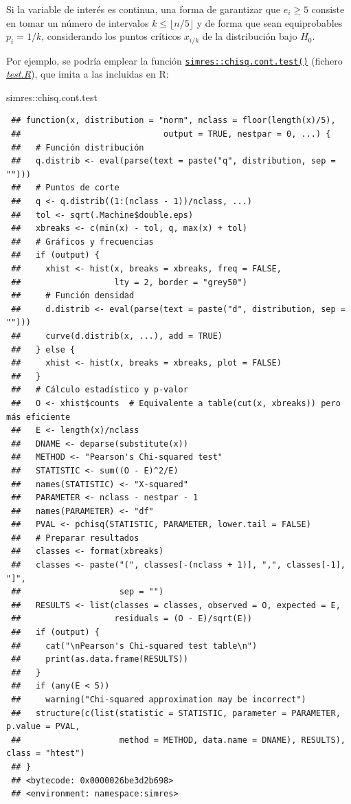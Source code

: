 \documentclass[
  10pt,
]{book}
\newenvironment{Shaded}{\begin{snugshade}}{\end{snugshade}}
\newcommand{\NormalTok}[1]{#1}
\newcommand{\SpecialCharTok}[1]{\textcolor[rgb]{0.00,0.00,0.00}{#1}}
\theoremstyle{break}
\theoremstyle{nonumberplain}
\begin{document}
Si la variable de interés es continua, una forma de garantizar que \(e_{i}\geq5\) consiste en tomar un número de intervalos \(k\leq \lfloor n/5 \rfloor\) y de forma que sean equiprobables \(p_{i}=1/k\),
considerando los puntos críticos \(x_{i/k}\) de la distribución bajo \(H_0\).

Por ejemplo, se podría emplear la función \href{https://rubenfcasal.github.io/simres/reference/chisq.cont.test.html}{\texttt{simres::chisq.cont.test()}} (fichero \href{R/test.R}{\emph{test.R}}), que imita a las incluidas en R:

\begin{Shaded}
\begin{Highlighting}[]
\NormalTok{simres}\SpecialCharTok{::}\NormalTok{chisq.cont.test}
\end{Highlighting}
\end{Shaded}

\begin{verbatim}
 ## function(x, distribution = "norm", nclass = floor(length(x)/5),
 ##                             output = TRUE, nestpar = 0, ...) {
 ##   # Función distribución
 ##   q.distrib <- eval(parse(text = paste("q", distribution, sep = "")))
 ##   # Puntos de corte
 ##   q <- q.distrib((1:(nclass - 1))/nclass, ...)
 ##   tol <- sqrt(.Machine$double.eps)
 ##   xbreaks <- c(min(x) - tol, q, max(x) + tol)
 ##   # Gráficos y frecuencias
 ##   if (output) {
 ##     xhist <- hist(x, breaks = xbreaks, freq = FALSE,
 ##                   lty = 2, border = "grey50")
 ##     # Función densidad
 ##     d.distrib <- eval(parse(text = paste("d", distribution, sep = "")))
 ##     curve(d.distrib(x, ...), add = TRUE)
 ##   } else {
 ##     xhist <- hist(x, breaks = xbreaks, plot = FALSE)
 ##   }
 ##   # Cálculo estadístico y p-valor
 ##   O <- xhist$counts  # Equivalente a table(cut(x, xbreaks)) pero más eficiente
 ##   E <- length(x)/nclass
 ##   DNAME <- deparse(substitute(x))
 ##   METHOD <- "Pearson's Chi-squared test"
 ##   STATISTIC <- sum((O - E)^2/E)
 ##   names(STATISTIC) <- "X-squared"
 ##   PARAMETER <- nclass - nestpar - 1
 ##   names(PARAMETER) <- "df"
 ##   PVAL <- pchisq(STATISTIC, PARAMETER, lower.tail = FALSE)
 ##   # Preparar resultados
 ##   classes <- format(xbreaks)
 ##   classes <- paste("(", classes[-(nclass + 1)], ",", classes[-1], "]",
 ##                    sep = "")
 ##   RESULTS <- list(classes = classes, observed = O, expected = E,
 ##                   residuals = (O - E)/sqrt(E))
 ##   if (output) {
 ##     cat("\nPearson's Chi-squared test table\n")
 ##     print(as.data.frame(RESULTS))
 ##   }
 ##   if (any(E < 5))
 ##     warning("Chi-squared approximation may be incorrect")
 ##   structure(c(list(statistic = STATISTIC, parameter = PARAMETER, p.value = PVAL,
 ##                    method = METHOD, data.name = DNAME), RESULTS), class = "htest")
 ## }
 ## <bytecode: 0x0000026be3d2b698>
 ## <environment: namespace:simres>
\end{verbatim}
\end{document}
